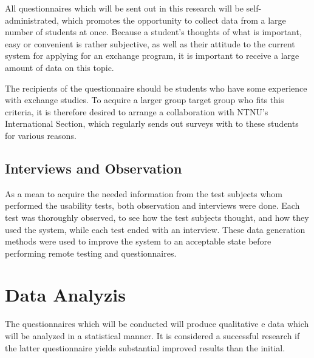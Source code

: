 All questionnaires which will be sent out in this research will be self-administrated, which promotes the opportunity to collect data from a large number of students at once. Because a student's thoughts of what is important, easy or convenient is rather subjective, as well as their attitude to the current system for applying for an exchange program, it is important to receive a large amount of data on this topic.

The recipients of the questionnaire should be students who have some experience with exchange studies. To acquire a larger group target group who fits this criteria, it is therefore desired to arrange a collaboration with NTNU's International Section, which regularly sends out surveys with to these students for various reasons.


\subsection{Interviews and Observation}
As a mean to acquire the needed information from the test subjects whom performed the usability tests, both observation and interviews were done. Each test was thoroughly observed, to see how the test subjects thought, and how they used the system, while each test ended with an interview. These data generation methods were used to improve the system to an acceptable state before performing remote testing and questionnaires.

\section{Data Analyzis}

The questionnaires which will be conducted will produce qualitative e data which will be analyzed in a statistical manner. It is considered a successful research if the latter questionnaire yields substantial improved results than the initial. 

\cleardoublepage
